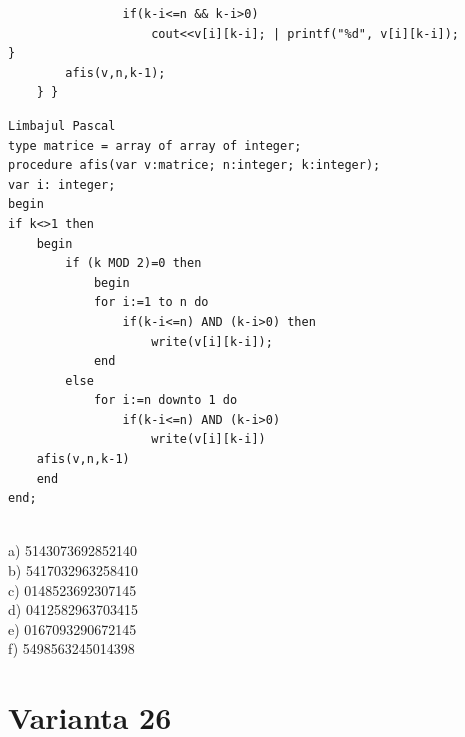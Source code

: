 {{\begin{verbatim}
                if(k-i<=n && k-i>0)
                    cout<<v[i][k-i]; | printf("%d", v[i][k-i]);
}
        afis(v,n,k-1);
    } }
\end{verbatim}
\begin{verbatim}
Limbajul Pascal
type matrice = array of array of integer;
procedure afis(var v:matrice; n:integer; k:integer);
var i: integer;
begin
if k<>1 then
    begin
        if (k MOD 2)=0 then
            begin
            for i:=1 to n do
                if(k-i<=n) AND (k-i>0) then
                    write(v[i][k-i]);
            end
        else
            for i:=n downto 1 do
                if(k-i<=n) AND (k-i>0)
                    write(v[i][k-i])
    afis(v,n,k-1)
    end
end;
\end{verbatim}
\\ 
a) 5143073692852140
\\
b) 5417032963258410
\\
c) 0148523692307145
\\
d) 0412582963703415
\\
e) 0167093290672145
\\
f) 5498563245014398
\\

\section*{Varianta 26}

}}
